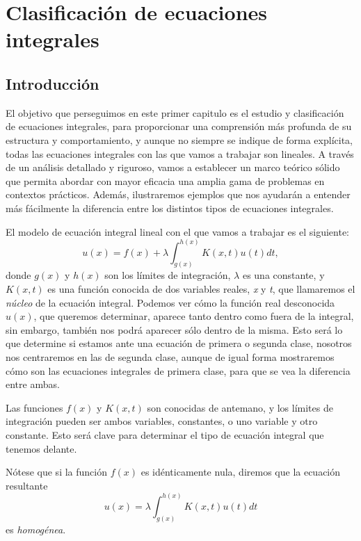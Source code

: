 
\chapter{Clasificación de ecuaciones integrales}\label{ch:primer-capitulo}

\section{Introducción}
El objetivo que perseguimos en este primer capitulo es el estudio y clasificación de ecuaciones integrales, para proporcionar una comprensión más profunda de su estructura y comportamiento, y aunque no siempre se indique de forma explícita, todas las ecuaciones integrales con las que vamos a trabajar son lineales. A través de un análisis detallado y riguroso, vamos a establecer un marco teórico sólido que permita abordar con mayor eficacia una amplia gama de problemas en contextos prácticos. Además, ilustraremos ejemplos que nos ayudarán a entender más fácilmente la diferencia entre los distintos tipos de ecuaciones integrales.

El modelo de ecuación integral lineal con el que vamos a trabajar es el siguiente:
\begin{equation}\label{}
	u(x) = f(x) + \lambda \int_{g(x)}^{h(x)} K(x,t)u(t)dt,
\end{equation}
donde $g(x)$ y $h(x)$ son los límites de integración, $\lambda$ es una constante, y $K(x,t)$ es una función conocida de dos variables reales, \textit{x} y \textit{t}, que llamaremos el \textit{núcleo} de la ecuación integral. Podemos ver cómo la función real desconocida $u(x)$, que queremos determinar,  aparece tanto dentro como fuera de la integral, sin embargo, también nos podrá aparecer sólo dentro de la misma. Esto será lo que determine si estamos ante una ecuación de primera o segunda clase, nosotros nos centraremos en las de segunda clase, aunque de igual forma mostraremos cómo son las ecuaciones integrales de primera clase, para que se vea la diferencia entre ambas.

Las funciones $f(x)$ y $K(x,t)$ son conocidas de antemano, y los límites de integración pueden ser ambos variables, constantes, o uno variable y otro constante. Esto será clave para determinar el tipo de ecuación integral que tenemos delante.\\
\begin{observacion}
	Nótese que si la función $f(x)$ es idénticamente nula, diremos que la ecuación resultante 
	\begin{equation}\label{}
		u(x) = \lambda \int_{g(x)}^{h(x)} K(x,t)u(t)dt
	\end{equation}
	es \textit{homogénea}.
\end{observacion}

